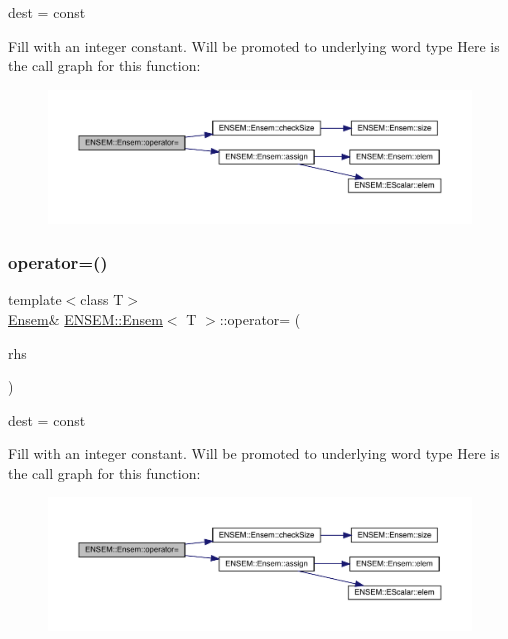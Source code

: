 dest = const 

Fill with an integer constant. Will be promoted to underlying word type Here is the call graph for this function\+:
\nopagebreak
\begin{figure}[H]
\begin{center}
\leavevmode
\includegraphics[width=350pt]{d7/d3e/classENSEM_1_1Ensem_a1331b77ba6b10ddefa983e39976b4db6_cgraph}
\end{center}
\end{figure}
\mbox{\label{classENSEM_1_1Ensem_a1331b77ba6b10ddefa983e39976b4db6}} 
\subsubsection{\texorpdfstring{operator=()}{operator=()}\hspace{0.1cm}{\footnotesize\ttfamily [2/15]}}
{\footnotesize\ttfamily template$<$class T$>$ \\
\mbox{\hyperlink{classENSEM_1_1Ensem}{Ensem}}\& \mbox{\hyperlink{classENSEM_1_1Ensem}{E\+N\+S\+E\+M\+::\+Ensem}}$<$ T $>$\+::operator= (\begin{DoxyParamCaption}\item[{const typename \mbox{\hyperlink{structENSEM_1_1WordType}{Word\+Type}}$<$ T $>$\+::Type\+\_\+t \&}]{rhs }\end{DoxyParamCaption})\hspace{0.3cm}{\ttfamily [inline]}}



dest = const 

Fill with an integer constant. Will be promoted to underlying word type Here is the call graph for this function\+:
\nopagebreak
\begin{figure}[H]
\begin{center}
\leavevmode
\includegraphics[width=350pt]{d7/d3e/classENSEM_1_1Ensem_a1331b77ba6b10ddefa983e39976b4db6_cgraph}
\end{center}
\end{figure}
\mbox{\label{classENSEM_1_1Ensem_a1331b77ba6b10ddefa983e39976b4db6}} 
